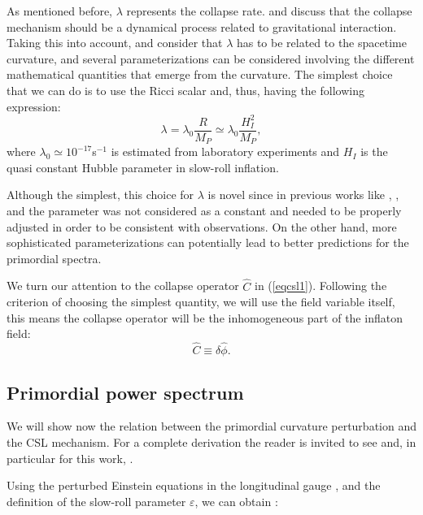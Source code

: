 \documentclass[baaa]{baaa}
\begin{document}
As mentioned before, $\lambda$ represents the collapse rate. \cite{Diosi:1984wuz, Diosi:1986nu, Diosi:1988uy} and \cite{Penrose:1996cv} discuss that the collapse mechanism should be a dynamical process related to gravitational interaction. Taking this into account, \cite{bengochealeonpearlesudarsky2020} and \cite{LeonBengochea2021} consider that $\lambda$ has to be related to the spacetime curvature, and several parameterizations can be considered involving the different mathematical quantities that emerge from the curvature. The simplest choice that we can do is to use the Ricci scalar and, thus, having the following expression:
\begin{equation}
    \lambda = \lambda_0 \frac{R}{M_P} \simeq \lambda_0 \frac{H_I^2}{M_P},
\end{equation}
where $\lambda_0 \simeq 10^{-17}$s$^{-1}$ is estimated from laboratory experiments and $H_I$ is the quasi constant Hubble parameter in slow-roll inflation.

Although the simplest, this choice for $\lambda$ is novel since in previous works like \cite{Canate2013}, \cite{LeonBengochea2016}, \cite{LeonBengochea2021} and \cite{Palermo:2022dim} the parameter was not considered as a constant and needed to be properly adjusted in order to be consistent with observations. On the other hand, more sophisticated parameterizations can potentially lead to better predictions for the primordial spectra.

We turn our attention to the collapse operator $\hat{C}$ in (\ref{eqcsl1}). Following the criterion of choosing the simplest quantity, we will use the field variable itself, this means the collapse operator will be the inhomogeneous part of the inflaton field:
\begin{equation}
    \hat{C}\equiv \delta \hat{\phi}.
\end{equation}

\subsection{Primordial power spectrum}

We will show now the relation between the primordial curvature perturbation and the CSL mechanism. For a complete derivation the reader is invited to see \cite{LeonBengochea2021} and, in particular for this work, \cite{ocampotesis}.

Using the perturbed Einstein equations in the longitudinal gauge \citep{Mukhanov1992, Mukhanov.physcosm.2005}, and the definition of the slow-roll parameter $\varepsilon$, we can obtain \citep{LeonBengochea2021}:
\end{document}
